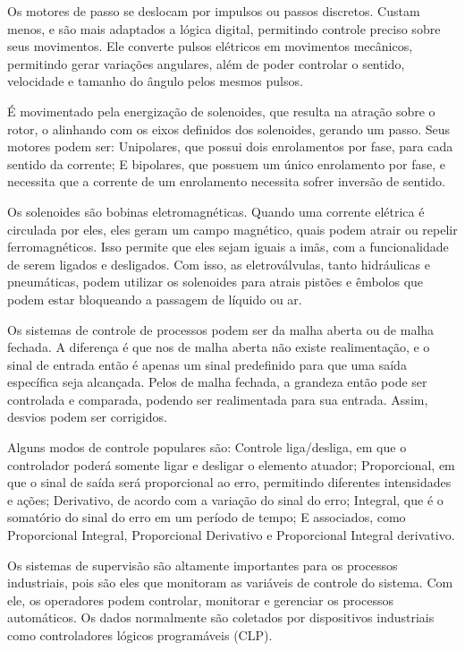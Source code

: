 \documentclass{article}
\begin{document}
 

Os motores de passo se deslocam por impulsos ou passos discretos. Custam menos, e são mais adaptados a lógica digital, permitindo controle preciso sobre seus movimentos. Ele converte pulsos elétricos em movimentos mecânicos, permitindo gerar variações angulares, além de poder controlar o sentido, velocidade e tamanho do ângulo pelos mesmos pulsos. 

É movimentado pela energização de solenoides, que resulta na atração sobre o rotor, o alinhando com os eixos definidos dos solenoides, gerando um passo. Seus motores podem ser: Unipolares, que possui dois enrolamentos por fase, para cada sentido da corrente; E bipolares, que possuem um único enrolamento por fase, e necessita que a corrente de um enrolamento necessita sofrer inversão de sentido. 

 

Os solenoides são bobinas eletromagnéticas. Quando uma corrente elétrica é circulada por eles, eles geram um campo magnético, quais podem atrair ou repelir ferromagnéticos. Isso permite que eles sejam iguais a imãs, com a funcionalidade de serem ligados e desligados. Com isso, as eletroválvulas, tanto hidráulicas e pneumáticas, podem utilizar os solenoides para atrais pistões e êmbolos que podem estar bloqueando a passagem de líquido ou ar. 

 

Os sistemas de controle de processos podem ser da malha aberta ou de malha fechada. A diferença é que nos de malha aberta não existe realimentação, e o sinal de entrada então é apenas um sinal predefinido para que uma saída específica seja alcançada. Pelos de malha fechada, a grandeza então pode ser controlada e comparada, podendo ser realimentada para sua entrada. Assim, desvios podem ser corrigidos.  

Alguns modos de controle populares são: Controle liga/desliga, em que o controlador poderá somente ligar e desligar o elemento atuador; Proporcional, em que o sinal de saída será proporcional ao erro, permitindo diferentes intensidades e ações; Derivativo, de acordo com a variação do sinal do erro; Integral, que é o somatório do sinal do erro em um período de tempo; E associados, como Proporcional Integral, Proporcional Derivativo e Proporcional Integral derivativo. 

 

Os sistemas de supervisão são altamente importantes para os processos industriais, pois são eles que monitoram as variáveis de controle do sistema. Com ele, os operadores podem controlar, monitorar e gerenciar os processos automáticos. Os dados normalmente são coletados por dispositivos industriais como controladores lógicos programáveis (CLP). 
\end{document}
